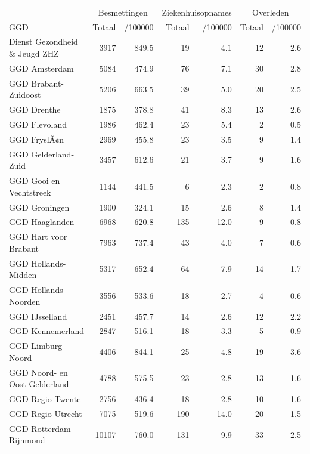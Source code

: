 \documentclass[
  english,
  man,floatsintext]{apa6}
\begin{document}
\begin{table}
\centering\begingroup\fontsize{10}{12}\selectfont

\begin{threeparttable}
\begin{tabular}{lrrrrrr}
\toprule
\multicolumn{1}{c}{ } & \multicolumn{2}{c}{Besmettingen} & \multicolumn{2}{c}{Ziekenhuisopnames} & \multicolumn{2}{c}{Overleden} \\
\cmidrule(l{3pt}r{3pt}){2-3} \cmidrule(l{3pt}r{3pt}){4-5} \cmidrule(l{3pt}r{3pt}){6-7}
GGD & Totaal & /100000 & Totaal & /100000 & Totaal & /100000\\
\midrule
Dienst Gezondheid \& Jeugd ZHZ & 3917 & 849.5 & 19 & 4.1 & 12 & 2.6\\
GGD Amsterdam & 5084 & 474.9 & 76 & 7.1 & 30 & 2.8\\
GGD Brabant-Zuidoost & 5206 & 663.5 & 39 & 5.0 & 20 & 2.5\\
GGD Drenthe & 1875 & 378.8 & 41 & 8.3 & 13 & 2.6\\
GGD Flevoland & 1986 & 462.4 & 23 & 5.4 & 2 & 0.5\\
GGD FryslÃ¢n & 2969 & 455.8 & 23 & 3.5 & 9 & 1.4\\
GGD Gelderland-Zuid & 3457 & 612.6 & 21 & 3.7 & 9 & 1.6\\
GGD Gooi en Vechtstreek & 1144 & 441.5 & 6 & 2.3 & 2 & 0.8\\
GGD Groningen & 1900 & 324.1 & 15 & 2.6 & 8 & 1.4\\
GGD Haaglanden & 6968 & 620.8 & 135 & 12.0 & 9 & 0.8\\
GGD Hart voor Brabant & 7963 & 737.4 & 43 & 4.0 & 7 & 0.6\\
GGD Hollands-Midden & 5317 & 652.4 & 64 & 7.9 & 14 & 1.7\\
GGD Hollands-Noorden & 3556 & 533.6 & 18 & 2.7 & 4 & 0.6\\
GGD IJsselland & 2451 & 457.7 & 14 & 2.6 & 12 & 2.2\\
GGD Kennemerland & 2847 & 516.1 & 18 & 3.3 & 5 & 0.9\\
GGD Limburg-Noord & 4406 & 844.1 & 25 & 4.8 & 19 & 3.6\\
GGD Noord- en Oost-Gelderland & 4788 & 575.5 & 23 & 2.8 & 13 & 1.6\\
GGD Regio Twente & 2756 & 436.4 & 18 & 2.8 & 10 & 1.6\\
GGD Regio Utrecht & 7075 & 519.6 & 190 & 14.0 & 20 & 1.5\\
GGD Rotterdam-Rijnmond & 10107 & 760.0 & 131 & 9.9 & 33 & 2.5\\

\end{tabular}
\end{threeparttable}
\end{table}
\end{document}
